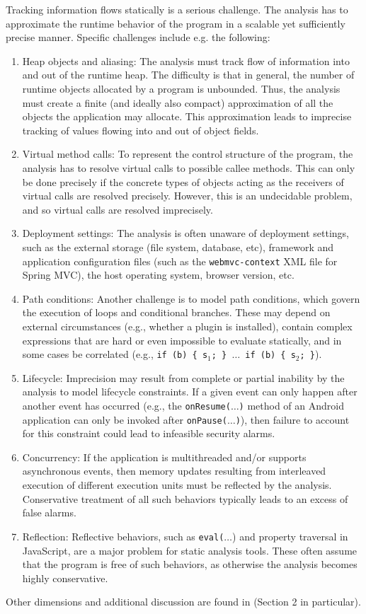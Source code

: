 Tracking information flows statically is a serious challenge. The analysis has to approximate the runtime behavior of the program in a scalable yet sufficiently precise manner. Specific challenges include e.g. the following:
\begin{enumerate}
	\item Heap objects and aliasing: The analysis must track flow of information into and out of the runtime heap. The difficulty is that in general, the number of runtime objects allocated by a program is unbounded. Thus, the analysis must create a finite (and ideally also compact) approximation of all the objects the application may allocate. This approximation leads to imprecise tracking of values flowing into and out of object fields.
	\item Virtual method calls: To represent the control structure of the program, the analysis has to resolve virtual calls to possible callee methods. This can only be done precisely if the concrete types of objects acting as the receivers of virtual calls are resolved precisely. However, this is an undecidable problem, and so virtual calls are resolved imprecisely.
	\item Deployment settings: The analysis is often unaware of deployment settings, such as the external storage (file system, database, etc), framework and application configuration files (such as the {\tt webmvc-context} XML file for Spring MVC), the host operating system, browser version, etc.
	\item Path conditions: Another challenge is to model path conditions, which govern the execution of loops and conditional branches. These may depend on external circumstances (e.g., whether a plugin is installed), contain complex expressions that are hard or even impossible to evaluate statically, and in some cases be correlated (e.g., {\tt if (b) \{ s$_1$; \} $\ldots$ if (b) \{ s$_2$; \}}).
	\item Lifecycle: Imprecision may result from complete or partial inability by the analysis to model lifecycle constraints. If a given event can only happen after another event has occurred (e.g., the {\tt onResume($\ldots$)} method of an Android application can only be invoked after {\tt onPause($\ldots$)}), then failure to account for this constraint could lead to infeasible security alarms.
	\item Concurrency: If the application is multithreaded and/or supports asynchronous events, then memory updates resulting from interleaved execution of different execution units must be reflected by the analysis. Conservative treatment of all such behaviors typically leads to an excess of false alarms.
	\item Reflection: Reflective behaviors, such as {\tt eval($\ldots$}) and property traversal in JavaScript, are a major problem for static analysis tools. These 
	often assume that the program is free of such behaviors, as otherwise the analysis becomes highly conservative.  
\end{enumerate}
Other dimensions and additional discussion are found in \cite{FHST:ENTCS} (Section 2 in particular).

